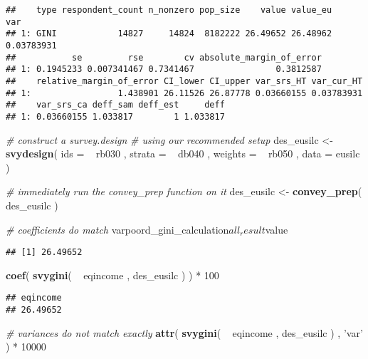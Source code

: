 \documentclass[]{book}
\newenvironment{Shaded}{\begin{snugshade}}{\end{snugshade}}
\newcommand{\KeywordTok}[1]{\textcolor[rgb]{0.13,0.29,0.53}{\textbf{{#1}}}}
\newcommand{\DataTypeTok}[1]{\textcolor[rgb]{0.13,0.29,0.53}{{#1}}}
\newcommand{\DecValTok}[1]{\textcolor[rgb]{0.00,0.00,0.81}{{#1}}}
\newcommand{\StringTok}[1]{\textcolor[rgb]{0.31,0.60,0.02}{{#1}}}
\newcommand{\CommentTok}[1]{\textcolor[rgb]{0.56,0.35,0.01}{\textit{{#1}}}}
\newcommand{\NormalTok}[1]{{#1}}
\begin{document}
\begin{verbatim}
##    type respondent_count n_nonzero pop_size    value value_eu        var
## 1: GINI            14827     14824  8182222 26.49652 26.48962 0.03783931
##           se         rse        cv absolute_margin_of_error
## 1: 0.1945233 0.007341467 0.7341467                0.3812587
##    relative_margin_of_error CI_lower CI_upper var_srs_HT var_cur_HT
## 1:                 1.438901 26.11526 26.87778 0.03660155 0.03783931
##    var_srs_ca deff_sam deff_est     deff
## 1: 0.03660155 1.033817        1 1.033817
\end{verbatim}

\begin{Shaded}
\begin{Highlighting}[]
\CommentTok{# construct a survey.design}
\CommentTok{# using our recommended setup}
\NormalTok{des_eusilc <-}\StringTok{ }
\StringTok{    }\KeywordTok{svydesign}\NormalTok{( }
        \DataTypeTok{ids =} \NormalTok{~}\StringTok{ }\NormalTok{rb030 , }
        \DataTypeTok{strata =} \NormalTok{~}\StringTok{ }\NormalTok{db040 ,  }
        \DataTypeTok{weights =} \NormalTok{~}\StringTok{ }\NormalTok{rb050 , }
        \DataTypeTok{data =} \NormalTok{eusilc}
    \NormalTok{)}

\CommentTok{# immediately run the convey_prep function on it}
\NormalTok{des_eusilc <-}\StringTok{ }\KeywordTok{convey_prep}\NormalTok{( des_eusilc )}

\CommentTok{# coefficients do match}
\NormalTok{varpoord_gini_calculation$all_result$value}
\end{Highlighting}
\end{Shaded}

\begin{verbatim}
## [1] 26.49652
\end{verbatim}

\begin{Shaded}
\begin{Highlighting}[]
\KeywordTok{coef}\NormalTok{( }\KeywordTok{svygini}\NormalTok{( ~}\StringTok{ }\NormalTok{eqincome , des_eusilc ) ) *}\StringTok{ }\DecValTok{100}
\end{Highlighting}
\end{Shaded}

\begin{verbatim}
## eqincome 
## 26.49652
\end{verbatim}

\begin{Shaded}
\begin{Highlighting}[]
\CommentTok{# variances do not match exactly}
\KeywordTok{attr}\NormalTok{( }\KeywordTok{svygini}\NormalTok{( ~}\StringTok{ }\NormalTok{eqincome , des_eusilc ) , }\StringTok{'var'} \NormalTok{) *}\StringTok{ }\DecValTok{10000}
\end{Highlighting}
\end{Shaded}
\end{document}
